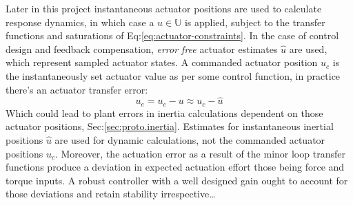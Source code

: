 Later in this project instantaneous actuator positions are used to calculate response dynamics, in which case a $u\in\mathbb{U}$ is applied, subject to the transfer functions and saturations of Eq:\ref{eq:actuator-constraints}. In the case of control design and feedback compensation, \emph{error free} actuator estimates $\hat{u}$ are used, which represent sampled actuator states. A commanded actuator position $u_c$ is the instantaneously set actuator value as per some control function, in practice there's an actuator transfer error:
\begin{equation}\label{eq:actuator-error}
u_e=u_c-u\approx u_c-\hat{u}
\end{equation}
Which could lead to plant errors in inertia calculations dependent on those actuator positions, Sec:\ref{sec:proto.inertia}. Estimates for instantaneous inertial positions $\hat{u}$ are used for dynamic calculations, not the commanded actuator positions $u_c$. Moreover, the actuation error as a result of the minor loop transfer functions produce a deviation in expected actuation effort those being force and torque inputs. A robust controller with a well designed gain ought to account for those deviations and retain stability irrespective\ldots

